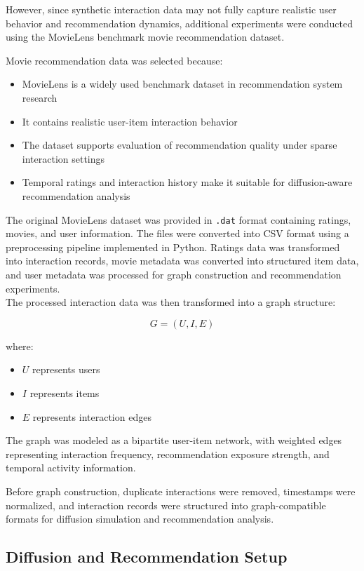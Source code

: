 \documentclass{article}
\begin{document}
However, since synthetic interaction data may not fully capture realistic user behavior and recommendation dynamics, additional experiments were conducted using the MovieLens benchmark movie recommendation dataset.

Movie recommendation data was selected because:
\begin{itemize}
\item MovieLens is a widely used benchmark dataset in recommendation system research
\item It contains realistic user-item interaction behavior
\item The dataset supports evaluation of recommendation quality under sparse interaction settings
\item Temporal ratings and interaction history make it suitable for diffusion-aware recommendation analysis
\end{itemize}

The original MovieLens dataset was provided in \texttt{.dat} format containing ratings, movies, and user information. The files were converted into CSV format using a preprocessing pipeline implemented in Python. Ratings data was transformed into interaction records, movie metadata was converted into structured item data, and user metadata was processed for graph construction and recommendation experiments. \\
The processed interaction data was then transformed into a graph structure:

\[
G = (U, I, E)
\]

where:
\begin{itemize}
\item \(U\) represents users
\item \(I\) represents items
\item \(E\) represents interaction edges
\end{itemize}

The graph was modeled as a bipartite user-item network, with weighted edges representing interaction frequency, recommendation exposure strength, and temporal activity information.

Before graph construction, duplicate interactions were removed, timestamps were normalized, and interaction records were structured into graph-compatible formats for diffusion simulation and recommendation analysis.


\subsection{Diffusion and Recommendation Setup}
\end{document}
